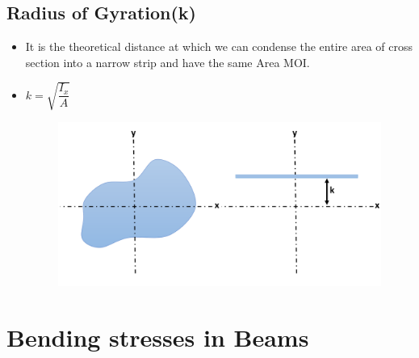 \documentclass[8pt]{report}
\begin{document}
	\section{Radius of Gyration(k)}
		\begin{itemize}
			\item It is the theoretical distance at which we can condense the entire area of cross section into a narrow strip and have the same Area MOI.
		\item $\boxed{k = \sqrt{\dfrac{I_x}{A}}}$
		\begin{figure}[H]
			\centering
			\includegraphics[scale=0.4]{radiusofgyration.png}
		\end{figure}
		\end{itemize}\hrulefill
\chapter{Bending stresses in Beams}	
\end{document}
